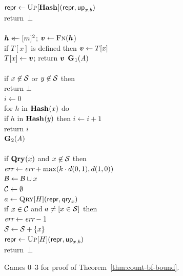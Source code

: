 \begin{figure}
{      $\mathsf{repr} \gets \textsc{Up}[\mathbf{Hash}\hspace{0.5pt}](\mathsf{repr},\mathsf{up}_{x,b})$\\
      return~$\bot$
    \\[6pt]
    \\
      $\hh \getsr [m]^2$; $\vv \gets \fff(\hh$)\\
      if $T[x]$ is defined then $\vv \gets T[x]$\\
      $T[x] \gets \vv$;
      return $\vv$
  }
  {
    \underline{$\mathbf{G}\hspace{0.5pt}_1(\mathit{A})$}\\[2pt]
    \\
      if $x \not\in \mathcal{S}$ or $y \not\in \mathcal{S}$ then\\
      \tab return $\bot$\\
      $i \gets 0$\\
      for $h$ in $\mathbf{Hash}\hspace{0.5pt}(x)$ do\\
      \tab if $h$ in $\mathbf{Hash}\hspace{0.5pt}(y)$ then $i \gets i+1$\\
      return $i$
    \\[6pt]
    \underline{$\mathbf{G}\hspace{0.5pt}_2(\mathit{A})$}\\[2pt]
    \\
      if $\mathbf{Qry}\hspace{0.5pt}(x)$ and $x \not\in \mathcal{S}$ then\\
      \tab $\textit{err} \gets \textit{err} + \max(k \cdot d(0,1), d(1,0))$\\
      $\mathcal{B} \gets \mathcal{B} \cup x$\\
      $\mathcal{C} \gets \emptyset$\\
      $a \gets \textsc{Qry}[H](\mathsf{repr}, \mathsf{qry}_x)$\\
      if $x \in \mathcal{C}$ and $a \neq [x \in \mathcal{S}]$ then\\
      \tab $\textit{err} \gets \textit{err}-1$\\
      $\mathcal{S} \gets \mathcal{S} + \{x\}$\\
      $\mathsf{repr} \gets \textsc{Up}[H](\mathsf{repr},\mathsf{up}_{x,b})$\\
      return~$\bot$
  }
  {
  }
  {
  }
  \caption{Games 0--3 for proof of Theorem~\ref{thm:count-bf-bound}.}
  \label{fig:count-bf-bound}
\end{figure}

